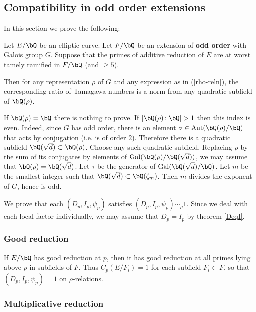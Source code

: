 \subsection{Compatibility in odd order extensions}

In this section we prove the following:

\begin{thm}
    Let $E / \bQ$ be an elliptic curve. Let $F / \bQ$ be an extension of \textbf{odd order} with Galois group $G$. Suppose that the primes of additive reduction of $E$ are at worst tamely ramified in $F / \bQ$ (and $\geq 5$). 
    
    Then for any representation $\rho$ of $G$ and any expression as in (\ref{rho-reln}), the corresponding ratio of Tamagawa numbers is a norm from any quadratic subfield of $\bQ(\rho)$.
\end{thm}

If $\bQ(\rho) = \bQ$ there is nothing to prove. 
If $[\bQ(\rho) \colon \bQ] > 1$ then this index is even. Indeed, since $G$ has odd order, there is an element $\sigma \in \Aut(\bQ(\rho) / \bQ)$ that acts by conjugation (i.e. is of order $2$). Therefore there is a quadratic subfield $\bQ(\sqrt{d}) \subset \bQ(\rho)$. Choose any such quadratic subfield. Replacing $\rho$ by the sum of its conjugates by elements of $ \Gal(\bQ(\rho) / \bQ(\sqrt{d}))$, we may assume that $\bQ(\rho) = \bQ(\sqrt{d})$. Let $\tau$ be the generator of $\Gal(\bQ(\sqrt{d}) / \bQ)$. Let $m$ be the smallest integer such that $\bQ(\sqrt{d}) \subset \bQ(\zeta_m)$. Then $m$ divides the exponent of $G$, hence is odd.

We prove that each $(D_p, I_p, \psi_p)$  satisfies $(D_p, I_p, \psi_p) \sim_{\rho} 1$. Since we deal with each local factor individually, we may assume that $D_p = I_p$ by theorem \ref{DeqI}. 

\subsubsection*{Good reduction}
If $E / \bQ$ has good reduction at $p$, then it has good reduction at all primes lying above $p$ in subfields of $F$. Thus $C_p(E / F_i) = 1$ for each subfield $F_i \subset F$, so that $(D_p, I_p, \psi_p) = 1$ on $\rho$-relations. 

\subsubsection*{Multiplicative reduction}

